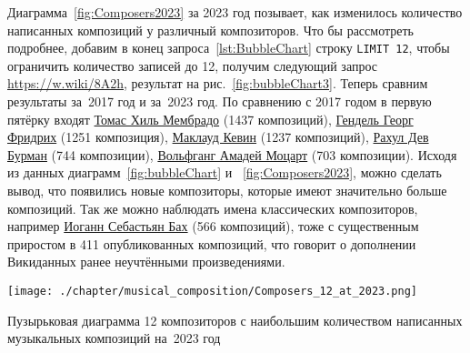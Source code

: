 Диаграмма~\ref{fig:Composers2023} за 2023 год позывает, как изменилось количество написанных композиций у различный композиторов. Что бы рассмотреть подробнее, добавим в конец запроса~\ref{lst:BubbleChart} строку  \lstinline|LIMIT 12|, чтобы ограничить количество записей до 12, получим следующий запрос \href{https://w.wiki/8A2h}{https://w.wiki/8A2h}, результат на рис.~\ref{fig:bubbleChart3}. Теперь сравним результаты за~2017 год и за~2023 год.
По сравнению с 2017 годом в первую пятёрку входят \href{https://ca.wikipedia.org/wiki/Tomàs_Gil_i_Membrado}{Томас Хиль Мембрадо} (\num{1437} композиций), \href{https://ru.wikipedia.org/wiki/Гендель,_Георг_Фридрих}{Гендель Георг Фридрих} (\num{1251} композиция), \href{https://ru.wikipedia.org/wiki/Маклауд,_Кевин}{Маклауд Кевин} (\num{1237} композиций), \href{https://en.wikipedia.org/wiki/R._D._Burman}{Рахул Дев Бурман} (\num{744} композиции), \href{https://ru.wikipedia.org/wiki/Моцарт,_Вольфганг_Амадей}{Вольфганг Амадей Моцарт} (\num{703} композиции). Исходя из данных диаграмм~\ref{fig:bubbleChart} и ~\ref{fig:Composers2023}, можно сделать вывод, что появились новые композиторы, которые имеют значительно больше композиций. Так же можно наблюдать имена классических композиторов, например \href{https://ru.wikipedia.org/wiki/Бах,_Иоганн_Себастьян}{Иоганн Себастьян Бах} (\num{566} композиций), тоже с существенным приростом в 411 опубликованных композиций, что говорит о дополнении Викиданных ранее неучтёнными произведениями.


\newpage
\begin{marginfigure}
  \texttt{[image: ./chapter/musical\_composition/Composers\_12\_at\_2023.png]}
  \caption[Диаграмма 12 композиторов с наибольшим количеством написанных музыкальных композиций на~2023 год]
          {Пузырьковая диаграмма 12 композиторов с наибольшим количеством написанных музыкальных композиций на~2023 год}%
  \label{fig:bubbleChart3}%
\end{marginfigure}



